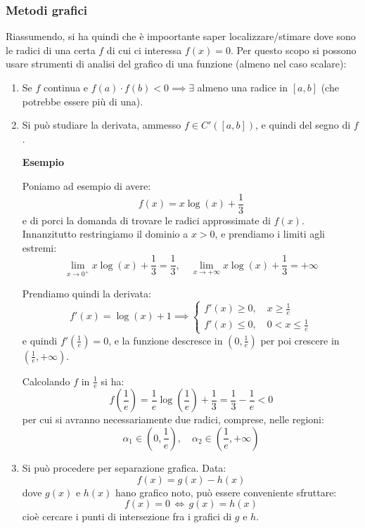 \documentclass[a4paper,11pt]{article}
\begin{document}
\subsubsection{Metodi grafici}
Riassumendo, si ha quindi che è impoortante saper localizzare/stimare dove sono le radici di una certa $f$ di cui ci interessa $f(x) = 0$.
Per questo scopo si possono usare strumenti di analisi del grafico di una funzione (almeno nel caso scalare):
\begin{enumerate}
	\item Se $f$ continua e $f(a) \cdot f(b) < 0 \implies \exists$ almeno una radice in $[a ,b]$ (che potrebbe essere più di una).
	\item Si può studiare la derivata, ammesso $f \in C'([a, b])$, e quindi del segno di $f$.

		\noindent
		\textbf{\textsf{Esempio}}

		Poniamo ad esempio di avere:
		$$
		f(x) = x \log(x) + \frac{1}{3}
		$$
		e di porci la domanda di trovare le radici approssimate di $f(x)$.
		Innanzitutto restringiamo il dominio a $x > 0$, e prendiamo i limiti agli estremi:
		$$
		\lim_{x \rightarrow 0^+} x \log(x) + \frac{1}{3} = \frac{1}{3}, \quad
		\lim_{x \rightarrow +\infty} x \log(x) + \frac{1}{3} = +\infty
		$$

		Prendiamo quindi la derivata:
		$$
		f'(x) = \log(x) + 1 \implies
		\begin{cases}
			f'(x) \geq 0, \quad x \geq \frac{1}{e} \\
			f'(x) \leq 0, \quad 0 < x \leq \frac{1}{e}
		\end{cases}
		$$
		e quindi $f'\left( \frac{1}{e} \right) = 0$, e la funzione descresce in $\left(0, \frac{1}{e} \right)$ per poi crescere in $\left( \frac{1}{e}, +\infty \right)$.

		Calcolando $f$ in $\frac{1}{e}$ si ha:
		$$
		f\left( \frac{1}{e} \right) = \frac{1}{e} \log\left( \frac{1}{e} \right) + \frac{1}{3} = \frac{1}{3} - \frac{1}{e} < 0
		$$
		per cui si avranno necessariamente due radici, comprese, nelle regioni:
		$$
		\alpha_1 \in \left(0, \frac{1}{e} \right), \quad \alpha_2 \in \left( \frac{1}{e}, +\infty \right)
		$$

	\item Si può procedere per separazione grafica.
		Data:
		$$
			f(x) = g(x) - h(x)
		$$
		dove $g(x)$ e $h(x)$ hano grafico noto, può essere conveniente sfruttare:
		$$
		f(x) = 0 \, \Leftrightarrow \, g(x) = h(x)
		$$
		cioè cercare i punti di intersezione fra i grafici di $g$ e $h$.
		

\end{enumerate}
\end{document}
